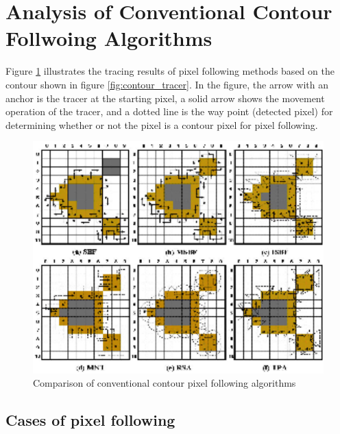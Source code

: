 
\section{Analysis of Conventional Contour Follwoing Algorithms}

Figure \ref{fig:comparison} illustrates the tracing results of pixel following methods based on the contour shown in figure \ref{fig:contour_tracer}. In the figure, the arrow with an anchor is the tracer at the starting pixel, a solid arrow shows the movement operation of the tracer, and a dotted line is the way point (detected pixel) for determining whether or not the pixel is a contour pixel for pixel following.

\begin{figure}[htbp]
	\centering
	\includegraphics[width=1.0\textwidth]{3.Analysis/comparison.png}
	\caption{Comparison of conventional contour pixel following algorithms}
	\label{fig:comparison}
\end{figure}



\subsection{Cases of pixel following}


